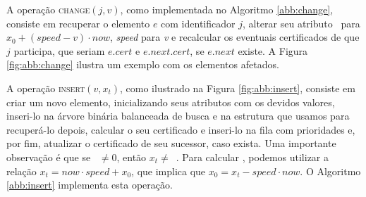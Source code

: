 






A operação \textsc{change}$(j, v)$, como implementada no Algoritmo
\ref{abb:change}, consiste em recuperar o elemento $e$ com
identificador $j$, alterar seu atributo \initv~para $x_0 +
(\mathit{speed} - v)\cdot now$, \textit{speed} para \textit{v} e
recalcular os eventuais certificados de que $j$ participa, que
seriam $e.cert$ e $e.next.cert$, se $e.next$ existe. A Figura
\ref{fig:abb:change} ilustra um exemplo com os elementos afetados.







A operação \textsc{insert}$(v, x_t)$, como ilustrado na Figura
\ref{fig:abb:insert}, consiste em criar um novo elemento,
inicializando seus atributos com os devidos valores, inseri-lo na
árvore binária balanceada de busca e na estrutura que usamos para
recuperá-lo depois, calcular o seu certificado e inseri-lo na fila
com prioridades e, por fim, atualizar o certificado de seu sucessor,
caso exista. Uma importante observação é que se \now~$\neq 0$, então
$x_t \neq$~\initv. Para calcular \initv, podemos utilizar a relação
$x_t = now\cdot speed + x_0$, que implica que $x_0 = x_t -
speed\cdot now$. O Algoritmo \ref{abb:insert} implementa esta
operação.

